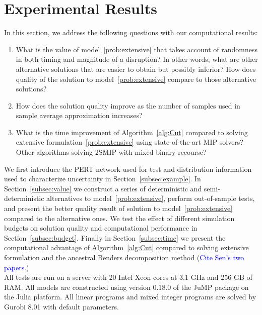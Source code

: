 \documentclass[11pt]{article}
\begin{document}
\section{Experimental Results} \label{sec:results}
	In this section, we address the following questions with our computational results:
	\begin{enumerate}
		\item What is the value of model~\eqref{prob:extensive} that takes account of randomness in both timing and magnitude of a disruption? In other words, what are other alternative solutions that are easier to obtain but possibly inferior? How does quality of the solution to model~\eqref{prob:extensive} compare to those alternative solutions?
		\item How does the solution quality improve as the number of samples used in sample average approximation increases? 
		\item What is the time improvement of Algorithm~\ref{alg:Cut} compared to solving extensive formulation~\eqref{prob:extensive} using state-of-the-art MIP solvers? Other algorithms solving 2SMIP with mixed binary recourse?
	\end{enumerate}
	We first introduce the PERT network used for test and distribution information used to characterize uncertainty in Section~\ref{subsec:example}. In Section~\ref{subsec:value} we construct a series of deterministic and semi-deterministic alternatives to model~\eqref{prob:extensive}, perform out-of-sample tests, and present the better quality result of solution to model~\eqref{prob:extensive} compared to the alternative ones. We test the effect of different simulation budgets on solution quality and computational performance in Section~\ref{subsec:budget}. Finally in Section~\ref{subsec:time} we present the computational advantage of Algorithm~\ref{alg:Cut} compared to solving extensive formulation and the ancestral Benders decomposition method (\textcolor{blue}{Cite Sen's two papers}.)\\
	\newline
	All tests are run on a server with 20 Intel Xeon cores at 3.1 GHz and 256 GB of RAM. All models are constructed using version 0.18.0 of the JuMP package \cite{DunningHuchetteLubin2017} on the Julia platform. All linear programs and mixed integer programs are solved by Gurobi 8.01 \cite{gurobi2016} with default parameters.
	
\end{document}

